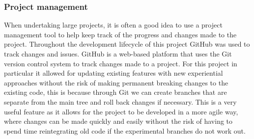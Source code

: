 \subsubsection{Project management}
When undertaking large projects, it is often a good idea to use a project management tool to help keep track of the progress and changes made to the project. Throughout the development lifecycle of this project GitHub was used to track changes and issues. GitHub is a web-based platform that uses the Git version control system to track changes made to a project. For this project in particular it allowed for updating existing features with new experiential approaches without the risk of making permanent breaking changes to the existing code, this is because through Git we can create branches that are separate from the main tree and roll back changes if necessary. This is a very useful feature as it allows for the project to be developed in a more agile way, where changes can be made quickly and easily without the risk of having to spend time reintegrating old code if the experimental branches do not work out.

